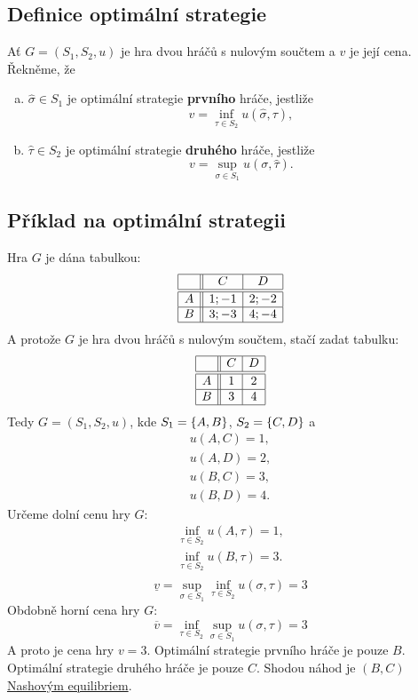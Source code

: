 \subsection{Definice optimální strategie}\label{optimalStrat}
Ať $G = (S_1, S_2, u)$ je hra dvou hráčů s nulovým součtem a $v$ je její cena.
Řekněme, že
\begin{enumerate}[(a)]
    \item $\hat \sigma \in S_1$ je optimální strategie \textbf{prvního} hráče, jestliže
    \[v = \inf_{\tau \in S_2} u(\hat \sigma, \tau),\]
    \item $\hat \tau \in S_2$ je optimální strategie \textbf{druhého} hráče, jestliže
    \[v = \sup_{\sigma \in S_1} u(\sigma, \hat \tau).\]
\end{enumerate}

\subsection{Příklad na optimální strategii}
Hra $G$ je dána tabulkou:
\[
\begin{array}{|c| |c|c|}
    \hline
    & C & D \\ \hline \hline
    A & 1;-1 & 2;-2 \\ \hline
    B & 3;-3 & 4;-4 \\ \hline
\end{array}
\]
A protože $G$ je hra dvou hráčů s nulovým součtem, stačí zadat tabulku:
\[
\begin{array}{|c| |c|c|}
    \hline
    & C & D \\ \hline \hline
    A & 1 & 2 \\ \hline
    B & 3 & 4 \\ \hline
\end{array}
\]
Tedy $G = (S_1, S_2, u)$, kde $S_1 = \left\lbrace A, B \right\rbrace$, $S_2 = \left\lbrace C, D \right\rbrace$ a
\begin{align*}
    u(A,C) = 1, \\
    u(A,D) = 2, \\
    u(B,C) = 3, \\
    u(B,D) = 4.
\end{align*}
Určeme dolní cenu hry $G$:
\begin{align*}
    \inf_{\tau \in S_2} u(A, \tau) = 1, \\
    \inf_{\tau \in S_2} u(B, \tau) = 3. \\
\end{align*}
\[
    \underline{v} = \sup_{\sigma \in S_1} \inf_{\tau \in S_2} u(\sigma, \tau) = 3
\]
Obdobně horní cena hry $G$:
\[
    \overline{v} = \inf_{\tau \in S_2} \sup_{\sigma \in S_1} u(\sigma, \tau) = 3
\]
A proto je cena hry $v = 3$. Optimální strategie prvního hráče je pouze $B$. Optimální strategie druhého hráče je pouze 
$C$.
Shodou náhod je $(B,C)$ \hyperref[nash]{Nashovým equilibriem}.

